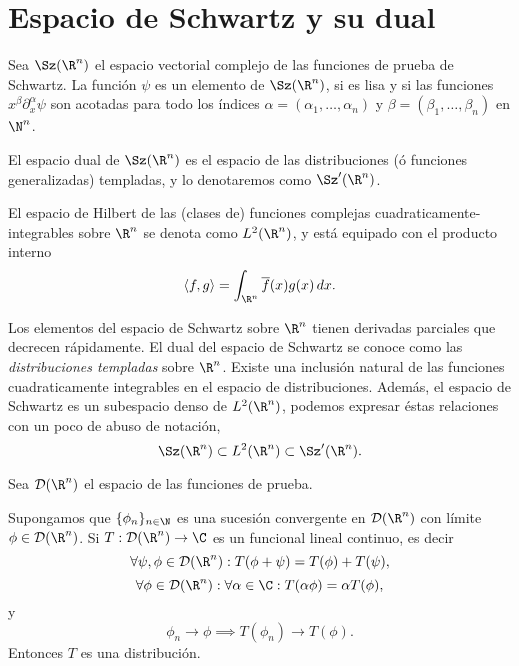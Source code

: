 \section{Espacio de Schwartz y su dual}

\begin{definition}
  Sea $\Sz(\R^{n})$ el espacio vectorial complejo
  de las funciones de prueba de Schwartz. La función
  $\psi$ es un elemento de $\Sz(\R^{n})$, si es
  lisa y si las funciones $x^{\beta} \partial_x^{\alpha}
  \psi$ son acotadas para todo los índices $\alpha =
  (\alpha_1, \ldots, \alpha_n)$ y $\beta = (\beta_1,
  \ldots, \beta_n)$ en $\N^{n}$.
\end{definition}

\begin{definition}
  El espacio dual de $\Sz(\R^{n})$ es el espacio de
  las distribuciones (ó funciones generalizadas)
  templadas, y lo denotaremos como $\Sz'(\R^{n})$.
\end{definition}

\begin{definition}
  El espacio de Hilbert de las (clases de) funciones
  complejas cuadraticamente-integrables sobre $\R^{n}$ se
  denota como $L^2(\R^{n})$, y está equipado con el
  producto interno
  \[
    \langle f, g \rangle
    = \int_{\R^{n}} \overline{f}(x) g(x) \, dx.
  \] 
\end{definition}

Los elementos del espacio de Schwartz sobre $\R^{n}$
tienen derivadas parciales que decrecen rápidamente. El
dual del espacio de Schwartz se conoce como las
\textit{distribuciones templadas} sobre $\R^{n}$. Existe
una inclusión natural de las funciones cuadraticamente
integrables en el espacio de distribuciones. Además, el
espacio de Schwartz es un subespacio denso de
$L^2(\R^{n})$, podemos expresar éstas relaciones con un
poco de abuso de notación,
\[
  \Sz(\R^{n})
  \subset L^2(\R^{n})
  \subset \Sz'(\R^{n}).
\]

Sea $\mathcal D(\R^{n})$ el espacio de las funciones de
prueba.

\begin{definition}
  Supongamos que $\{\phi_n\}_{n \in \N}$ es una sucesión
  convergente en $\mathcal D(\R^{n})$ con límite $\phi \in
  \mathcal D(\R^{n})$. Si $T : \mathcal D(\R^{n}) \to \C$
  es un funcional lineal continuo, es decir
  \[
    \forall \psi, \phi \in \mathcal D(\R^{n}) : T(\phi +
    \psi) = T(\phi) + T(\psi),
  \] 
  \[
    \forall \phi \in \mathcal D(\R^{n}) : \forall \alpha
    \in \C : T(\alpha \phi) = \alpha T(\phi),
  \] 
  y
  \[
    \phi_n \to \phi \implies T(\phi_n) \to T(\phi).
  \] 
  Entonces $T$ es una distribución.
\end{definition}

